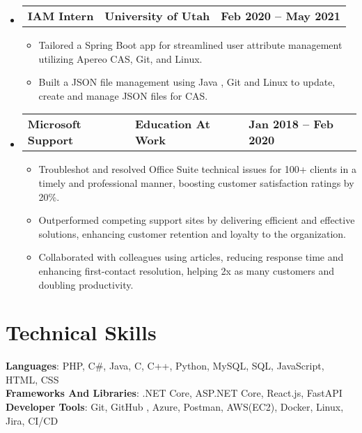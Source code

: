 \documentclass[letterpaper,11pt]{article}
\begin{document}
\begin{itemize}[leftmargin=0.05in, label={}]
	\item{
	            \begin{tabu} to \dimexpr\textwidth-0.15in {X[l] X[c] X[r]}
		            \textbf{IAM Intern} & \textbf{University of Utah} & \textbf{Feb 2020 -- May 2021} \\
	            \end{tabu}

	            \begin{itemize}[label=$\bullet$]
		            \item{Tailored a Spring Boot app for streamlined user attribute management utilizing Apereo CAS, Git, and Linux.}
		            \item{Built a JSON file management using Java , Git and Linux to update, create and manage JSON files for CAS.}
	            \end{itemize}
	      }

	\item{
	            \begin{tabu} {X[l] X[c] X[r]}
		            \textbf{Microsoft Support} & \textbf{Education At Work} & \textbf{Jan 2018 -- Feb 2020} \\
	            \end{tabu}
	            \begin{itemize} [label=$\bullet$]
		            \item{Troubleshot and resolved Office Suite technical issues for 100+ clients in a timely and professional manner, boosting customer satisfaction ratings by 20\%.}
		            \item{Outperformed competing support sites by delivering efficient and effective solutions, enhancing customer retention and loyalty to the organization.}
		            \item{Collaborated with colleagues using articles, reducing response time and enhancing first-contact resolution, helping 2x as many customers and doubling productivity.}
	            \end{itemize}
	      }

\end{itemize}


\section{\textbf{Technical Skills}}
\begin{itemize}[leftmargin=0.05in, label={}]
	{\item{
		            \textbf{Languages}{: PHP, C\#, Java, C, C++, Python, MySQL, SQL, JavaScript, HTML, CSS} \\
		            \textbf{Frameworks And Libraries}{: .NET Core, ASP.NET Core, React.js, FastAPI} \\
		            \textbf{Developer Tools}{: Git, GitHub , Azure, Postman, AWS(EC2), Docker, Linux, Jira, CI/CD} \\
		      }}
\end{itemize}
\end{document}
